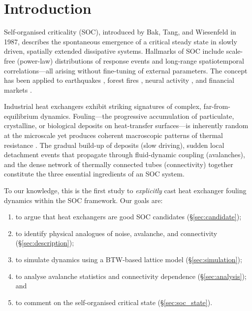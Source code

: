 \documentclass[10pt,a4paper,twocolumn]{article}
\begin{document}
\section{Introduction}
\label{sec:intro}

Self-organised criticality (SOC), introduced by Bak, Tang, and Wiesenfeld
\cite{bak1987} in 1987, describes the spontaneous emergence of a critical
steady state in slowly driven, spatially extended dissipative systems.
Hallmarks of SOC include scale-free (power-law) distributions of response
events and long-range spatiotemporal correlations---all arising without
fine-tuning of external parameters. The concept has been applied
to earthquakes \cite{olami1992}, forest fires \cite{drossel1992}, neural
activity \cite{beggs2003}, and financial markets \cite{scheinkman1994}.

Industrial heat exchangers exhibit striking signatures of complex,
far-from-equilibrium dynamics. Fouling---the progressive accumulation of
particulate, crystalline, or biological deposits on heat-transfer
surfaces---is inherently random at the microscale yet produces coherent
macroscopic patterns of thermal resistance \cite{muller1988}. The gradual
build-up of deposits (slow driving), sudden local detachment events that
propagate through fluid-dynamic coupling (avalanches), and the dense network
of thermally connected tubes (connectivity) together constitute the three
essential ingredients of an SOC system.

To our knowledge, this is the first study to \emph{explicitly} cast heat
exchanger fouling dynamics within the SOC framework. Our goals are:
\begin{enumerate}
  \item to argue that heat exchangers are good SOC candidates (\S\ref{sec:candidate});
  \item to identify physical analogues of noise, avalanche, and connectivity
        (\S\ref{sec:description});
  \item to simulate dynamics using a BTW-based lattice model
        (\S\ref{sec:simulation});
  \item to analyse avalanche statistics and connectivity dependence
        (\S\ref{sec:analysis}); and
  \item to comment on the self-organised critical state (\S\ref{sec:soc_state}).
\end{enumerate}

\end{document}

